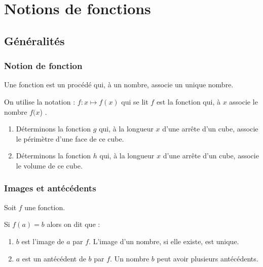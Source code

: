\documentclass[a4paper,10pt]{report}
\begin{document}
\newpage
\setcounter{chapter}{5}
\chapter{Notions de fonctions}

\section{Généralités}

\subsection{Notion de fonction}

\begin{defn}
Une fonction est un procédé qui, à un nombre, associe un unique nombre.
\end{defn}

\begin{rem}
On utilise la notation : $f \colon x \mapsto f(x)$ qui se lit \og $f$ est la fonction qui, à $x$ associe le nombre $f(x$) \fg{}.
\end{rem}

\begin{ex}
\begin{enumerate}
\item Déterminons la fonction $g$ qui, à la longueur $x$ d'une arrête d'un cube, associe le périmètre d'une face de ce cube.

\noindent\grandscarreaux{\linewidth}{1.6cm}
\item Déterminons la fonction $h$ qui, à la longueur $x$ d'une arrête d'un cube, associe le volume de ce cube.

\noindent\grandscarreaux{\linewidth}{1.6cm}
\end{enumerate}
\end{ex}

\subsection{Images et antécédents}

\begin{defn}
Soit $f$ une fonction.

\medskip
\noindent Si $f(a)=b$ alors on dit que :
\begin{enumerate}
\item[•] $b$ est l'image de $a$ par $f$. L'image d'un nombre, si elle existe, est unique.
\item[•] $a$ est un antécédent de $b$ par $f$. Un nombre $b$ peut avoir plusieurs antécédents.
\end{enumerate}
\end{defn}
\end{document}
